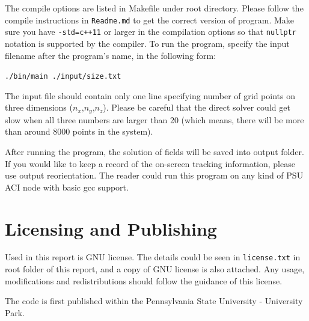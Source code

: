 \documentclass{article}
\begin{document}
\begin{spacing}{1.1}
\begin{appendices}
The compile options are listed in Makefile under root directory. Please follow the compile instructions in \texttt{Readme.md} to get the correct version of program. Make sure you have \texttt{-std=c++11} or larger in the compilation options so that \texttt{nullptr} notation is supported by the compiler. To run the program, specify the input filename after the program's name, in the following form:

\texttt{./bin/main ./input/size.txt}

The input file should contain only one line specifying number of grid points on three dimensions ($n_x$,$n_y$,$n_z$). Please be careful that the direct solver could get slow when all three numbers are larger than 20 (which means, there will be more than around 8000 points in the system).

After running the program, the solution of fields will be saved into output folder. If you would like to keep a record of the on-screen tracking information, please use output reorientation. The reader could run this program on any kind of PSU ACI node with basic gcc support.

\section{Licensing and Publishing}

Used in this report is GNU license. The details could be seen in \texttt{license.txt} in root folder of this report, and a copy of GNU license is also attached. Any usage, modifications and redistributions should follow the guidance of this license.

The code is first published within the Pennsylvania State University - University Park.

\end{appendices}




\end{spacing}
\end{document}
